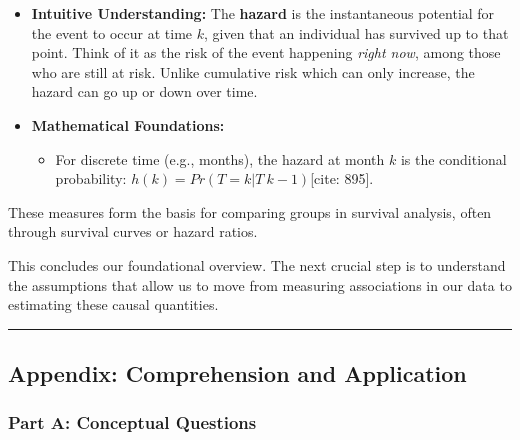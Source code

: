 \documentclass[
  10pt,
  letterpaper,
  DIV=11,
  numbers=noendperiod]{scrartcl}
\providecommand{\tightlist}{%
  \setlength{\itemsep}{0pt}\setlength{\parskip}{0pt}}
\begin{document}
\begin{itemize}
\tightlist
\item
  \textbf{Intuitive Understanding:} The \textbf{hazard} is the
  instantaneous potential for the event to occur at time \(k\), given
  that an individual has survived up to that point. Think of it as the
  risk of the event happening \emph{right now}, among those who are
  still at risk. Unlike cumulative risk which can only increase, the
  hazard can go up or down over time.
\item
  \textbf{Mathematical Foundations:}

  \begin{itemize}
  \tightlist
  \item
    For discrete time (e.g., months), the hazard at month \(k\) is the
    conditional probability: \(h(k) = Pr(T=k | T \> k-1)\){[}cite:
    895{]}.
  \end{itemize}
\end{itemize}

These measures form the basis for comparing groups in survival analysis,
often through survival curves or hazard ratios.

This concludes our foundational overview. The next crucial step is to
understand the assumptions that allow us to move from measuring
associations in our data to estimating these causal quantities.

\begin{center}\rule{0.5\linewidth}{0.5pt}\end{center}

\subsection{Appendix: Comprehension and
Application}\label{appendix-comprehension-and-application}

\subsubsection{Part A: Conceptual
Questions}\label{part-a-conceptual-questions}
\end{document}
